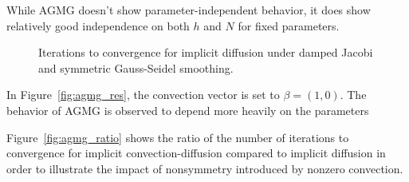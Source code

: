 \documentclass[final,leqno]{siamltex}
\begin{document}
While AGMG doesn't show parameter-independent behavior, it does show relatively good independence on both $h$ and $N$ for fixed parameters.  
\begin{figure}
\caption{Iterations to convergence for implicit diffusion under damped Jacobi and symmetric Gauss-Seidel smoothing.}
\label{fig:agmg_ref}
\end{figure}
In Figure~\ref{fig:agmg_res}, the convection vector is set to $\beta = (1,0)$.  The behavior of AGMG is observed to depend more heavily on the parameters 

Figure~\ref{fig:agmg_ratio} shows the ratio of the number of iterations to convergence for implicit convection-diffusion compared to implicit diffusion in order to illustrate the impact of nonsymmetry introduced by nonzero convection.  
\end{document}
